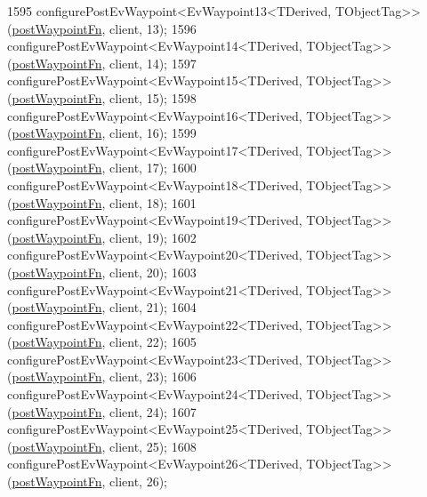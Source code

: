 \begin{DoxyCode}
1595     configurePostEvWaypoint<EvWaypoint13<TDerived, TObjectTag>>(\hyperlink{classcl__move__base__z_1_1WaypointEventDispatcher_a964a57fcce5d48ec60243230722d8dd7}{postWaypointFn}, client, 13);
1596     configurePostEvWaypoint<EvWaypoint14<TDerived, TObjectTag>>(\hyperlink{classcl__move__base__z_1_1WaypointEventDispatcher_a964a57fcce5d48ec60243230722d8dd7}{postWaypointFn}, client, 14);
1597     configurePostEvWaypoint<EvWaypoint15<TDerived, TObjectTag>>(\hyperlink{classcl__move__base__z_1_1WaypointEventDispatcher_a964a57fcce5d48ec60243230722d8dd7}{postWaypointFn}, client, 15);
1598     configurePostEvWaypoint<EvWaypoint16<TDerived, TObjectTag>>(\hyperlink{classcl__move__base__z_1_1WaypointEventDispatcher_a964a57fcce5d48ec60243230722d8dd7}{postWaypointFn}, client, 16);
1599     configurePostEvWaypoint<EvWaypoint17<TDerived, TObjectTag>>(\hyperlink{classcl__move__base__z_1_1WaypointEventDispatcher_a964a57fcce5d48ec60243230722d8dd7}{postWaypointFn}, client, 17);
1600     configurePostEvWaypoint<EvWaypoint18<TDerived, TObjectTag>>(\hyperlink{classcl__move__base__z_1_1WaypointEventDispatcher_a964a57fcce5d48ec60243230722d8dd7}{postWaypointFn}, client, 18);
1601     configurePostEvWaypoint<EvWaypoint19<TDerived, TObjectTag>>(\hyperlink{classcl__move__base__z_1_1WaypointEventDispatcher_a964a57fcce5d48ec60243230722d8dd7}{postWaypointFn}, client, 19);
1602     configurePostEvWaypoint<EvWaypoint20<TDerived, TObjectTag>>(\hyperlink{classcl__move__base__z_1_1WaypointEventDispatcher_a964a57fcce5d48ec60243230722d8dd7}{postWaypointFn}, client, 20);
1603     configurePostEvWaypoint<EvWaypoint21<TDerived, TObjectTag>>(\hyperlink{classcl__move__base__z_1_1WaypointEventDispatcher_a964a57fcce5d48ec60243230722d8dd7}{postWaypointFn}, client, 21);
1604     configurePostEvWaypoint<EvWaypoint22<TDerived, TObjectTag>>(\hyperlink{classcl__move__base__z_1_1WaypointEventDispatcher_a964a57fcce5d48ec60243230722d8dd7}{postWaypointFn}, client, 22);
1605     configurePostEvWaypoint<EvWaypoint23<TDerived, TObjectTag>>(\hyperlink{classcl__move__base__z_1_1WaypointEventDispatcher_a964a57fcce5d48ec60243230722d8dd7}{postWaypointFn}, client, 23);
1606     configurePostEvWaypoint<EvWaypoint24<TDerived, TObjectTag>>(\hyperlink{classcl__move__base__z_1_1WaypointEventDispatcher_a964a57fcce5d48ec60243230722d8dd7}{postWaypointFn}, client, 24);
1607     configurePostEvWaypoint<EvWaypoint25<TDerived, TObjectTag>>(\hyperlink{classcl__move__base__z_1_1WaypointEventDispatcher_a964a57fcce5d48ec60243230722d8dd7}{postWaypointFn}, client, 25);
1608     configurePostEvWaypoint<EvWaypoint26<TDerived, TObjectTag>>(\hyperlink{classcl__move__base__z_1_1WaypointEventDispatcher_a964a57fcce5d48ec60243230722d8dd7}{postWaypointFn}, client, 26);

\end{DoxyCode}
